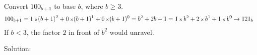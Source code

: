 Convert $100_{b+1}$ to base $b$, where $b\ge3$.
\begin{align*}
100_{b+1} 
= 1 \mult (b+1)^{2} + 0 \mult (b+1)^{1} + 0 \mult (b+1)^{0}
= b^{2} + 2b + 1
= 1 \mult b^{2} + 2 \mult b^{1} + 1 \mult b^{0}
\to 121_{b}
\end{align*}
If $b<3$, the factor $2$ in front of $b^{2}$ would unravel. 

Solution: 